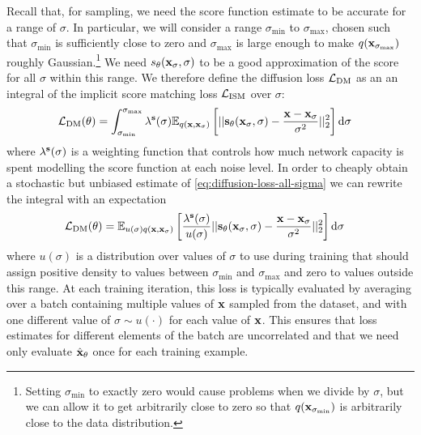 Recall that, for sampling, we need the score function estimate to be accurate for a range of $\sigma$. In particular, we will consider a range $\sigma_\text{min}$ to $\sigma_\text{max}$, chosen such that $\sigma_\text{min}$ is sufficiently close to zero and $\sigma_\text{max}$ is large enough to make $q({\mathbf{x}}_{\sigma_\text{max}})$ roughly Gaussian.\footnote{Setting $\sigma_\text{min}$ to exactly zero would cause problems when we divide by $\sigma$, but we can allow it to get arbitrarily close to zero so that $q({\mathbf{x}}_{\sigma_\text{min}})$ is arbitrarily close to the data distribution.} We need $s_\theta({\mathbf{x}}_\sigma, \sigma)$ to be a good approximation of the score for all $\sigma$ within this range. We therefore define the diffusion loss ${\mathcal{L}}_\text{DM}$ as an an integral of the implicit score matching loss ${\mathcal{L}}_\text{ISM}$ over $\sigma$:
\begin{align} \label{eq:diffusion-loss-all-sigma}
    \mathcal{L}_\text{DM}(\theta) &= \int_{\sigma_\text{min}}^{\sigma_\text{max}} \lambda^{\mathbf{s}}(\sigma) \mathbb{E}_{q({\mathbf{x}}, {\mathbf{x}}_\sigma)} \left[ 
    || {\mathbf{s}}_\theta({\mathbf{x}}_\sigma, \sigma) - \frac{{\mathbf{x}}-{\mathbf{x}}_\sigma}{\sigma^2} ||_2^2 \right] \mathrm{d}\sigma
\end{align}
where $\lambda^{\mathbf{s}}(\sigma)$ is a weighting function that controls how much network capacity is spent modelling the score function at each noise level. In order to cheaply obtain a stochastic but unbiased estimate of \cref{eq:diffusion-loss-all-sigma} we can rewrite the integral with an expectation
\begin{align} \label{eq:exp-diffusion-loss-all-sigma}
    \mathcal{L}_\text{DM}(\theta) &= \mathbb{E}_{u(\sigma)q({\mathbf{x}}, {\mathbf{x}}_\sigma)} \left[ \frac{\lambda^{\mathbf{s}}(\sigma)}{u(\sigma)} 
    || {\mathbf{s}}_\theta({\mathbf{x}}_\sigma, \sigma) - \frac{{\mathbf{x}}-{\mathbf{x}}_\sigma}{\sigma^2} ||_2^2 \right] \mathrm{d}\sigma
\end{align}
where $u(\sigma)$ is a distribution over values of $\sigma$ to use during training that should assign positive density to values between $\sigma_\text{min}$ and $\sigma_\text{max}$ and zero to values outside this range. At each training iteration, this loss is typically evaluated by averaging over a batch containing multiple values of ${\mathbf{x}}$ sampled from the dataset, and with one different value of $\sigma \sim u(\cdot)$ for each value of ${\mathbf{x}}$. This ensures that loss estimates for different elements of the batch are uncorrelated and that we need only evaluate $\hat{{\mathbf{x}}}_\theta$ once for each training example.



